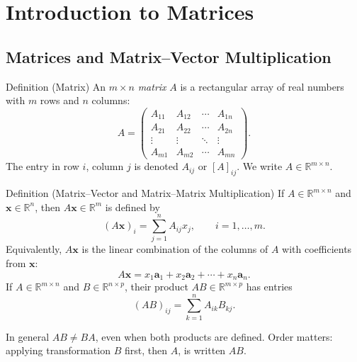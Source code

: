 
\section{Introduction to Matrices}

\subsection*{Matrices and Matrix--Vector Multiplication}

\begin{propositionbox}{Definition (Matrix)}
An $m \times n$ \emph{matrix} $A$ is a rectangular array of real numbers with
$m$ rows and $n$ columns:
\[
  A = \begin{pmatrix}
    A_{11} & A_{12} & \cdots & A_{1n} \\
    A_{21} & A_{22} & \cdots & A_{2n} \\
    \vdots & \vdots & \ddots & \vdots \\
    A_{m1} & A_{m2} & \cdots & A_{mn}
  \end{pmatrix}.
\]
The entry in row $i$, column $j$ is denoted $A_{ij}$ or $[A]_{ij}$.
We write $A \in \mathbb{R}^{m \times n}$.
\end{propositionbox}

\begin{propositionbox}{Definition (Matrix--Vector and Matrix--Matrix Multiplication)}
If $A \in \mathbb{R}^{m \times n}$ and $\mathbf{x} \in \mathbb{R}^n$, then
$A\mathbf{x} \in \mathbb{R}^m$ is defined by
\[
  (A\mathbf{x})_i = \sum_{j=1}^n A_{ij} x_j, \qquad i = 1, \ldots, m.
\]
Equivalently, $A\mathbf{x}$ is the linear combination of the columns of $A$
with coefficients from $\mathbf{x}$:
\[
  A\mathbf{x} = x_1 \mathbf{a}_1 + x_2 \mathbf{a}_2 + \cdots + x_n \mathbf{a}_n.
\]
If $A \in \mathbb{R}^{m \times n}$ and $B \in \mathbb{R}^{n \times p}$, their product
$AB \in \mathbb{R}^{m \times p}$ has entries
\[
  (AB)_{ij} = \sum_{k=1}^n A_{ik} B_{kj}.
\]
\end{propositionbox}

\begin{remark*}
In general $AB \neq BA$, even when both products are defined.
Order matters: applying transformation $B$ first, then $A$, is written $AB$.
\end{remark*}


